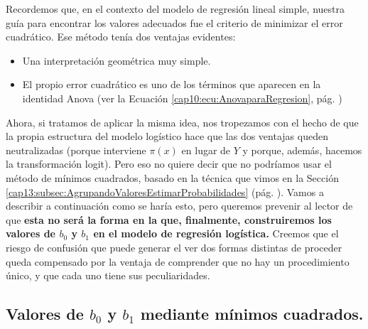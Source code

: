 Recordemos que, en el contexto del modelo de regresión lineal simple, nuestra guía para encontrar los valores adecuados fue el criterio de minimizar el error cuadrático. Ese método tenía dos ventajas evidentes:
\begin{itemize}
  \item Una interpretación geométrica muy simple.
  \item El propio error cuadrático es uno de los términos que aparecen en la identidad Anova (ver la Ecuación \ref{cap10:ecu:AnovaparaRegresion}, pág. \pageref{cap10:ecu:AnovaparaRegresion})
\end{itemize}
Ahora, si tratamos de aplicar la misma idea, nos tropezamos con el hecho de que la propia estructura del modelo logístico hace que las dos ventajas queden neutralizadas (porque interviene $\pi(x)$ en lugar de $Y$ y porque, además, hacemos la transformación logit). Pero eso no quiere decir que no podríamos usar el método de mínimos cuadrados, basado en la técnica que vimos en la Sección \ref{cap13:subsec:AgrupandoValoresEstimarProbabilidades} (pág. \pageref{cap13:subsec:AgrupandoValoresEstimarProbabilidades}). Vamos a describir a continuación como se haría esto, pero queremos prevenir al lector de que {\bf esta no será la forma en la que, finalmente, construiremos los valores de $b_0$ y $b_1$ en el modelo de regresión logística.} Creemos que el riesgo de confusión que puede generar el ver dos formas distintas de proceder queda compensado por la ventaja de comprender que no hay un procedimiento único, y que cada uno tiene sus peculiaridades.

\subsection{Valores de $b_0$ y $b_1$  mediante mínimos cuadrados.}
\label{cap13:subsection:ParametrosCurvaSigmoideaMedianteMinimosCuadrados}


